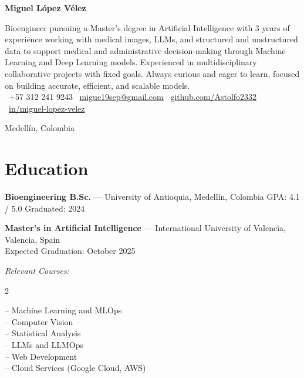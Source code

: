 \documentclass[10pt,a4paper]{article}
\begin{document}
\begin{center}
    {\LARGE \textbf{Miguel López Vélez}} \\[6pt]
\end{center}

Bioengineer pursuing a Master's degree in Artificial Intelligence with 3 years of experience working with medical images, LLMs, and structured and unstructured data to support medical and administrative decision-making through Machine Learning and Deep Learning models. Experienced in multidisciplinary collaborative projects with fixed goals. Always curious and eager to learn, focused on building accurate, efficient, and scalable models. \\[-1pt]

    \faPhone\ +57 312 241 9243 \quad
    \faEnvelope\ \href{mailto:migue19sep@gmail.com}{migue19sep@gmail.com} \quad
    \faGithub\ \href{https://github.com/Astolfo2332}{github.com/Astolfo2332} \quad
    \faLinkedin\ \href{https://www.linkedin.com/in/miguel-lopez-velez/}{in/miguel-lopez-velez}

\begin{center}    
    Medellín, Colombia
\end{center}
\section*{Education}

\textbf{Bioengineering B.Sc.} — University of Antioquia, Medellín, Colombia GPA: 4.1 / 5.0 \hfill Graduated: 2024

\textbf{Master’s in Artificial Intelligence} — International University of Valencia, Valencia, Spain \\
Expected Graduation: October 2025

\textit{Relevant Courses:}
\setlength{\multicolsep}{2pt}
\begin{multicols}{2}
\raggedright
-- Machine Learning and MLOps \\
-- Computer Vision\\
-- Statistical Analysis\\
-- LLMs and LLMOps\\
-- Web Development\\
-- Cloud Services (Google Cloud, AWS)
\end{multicols}
\vspace{-10pt}
\end{document}
